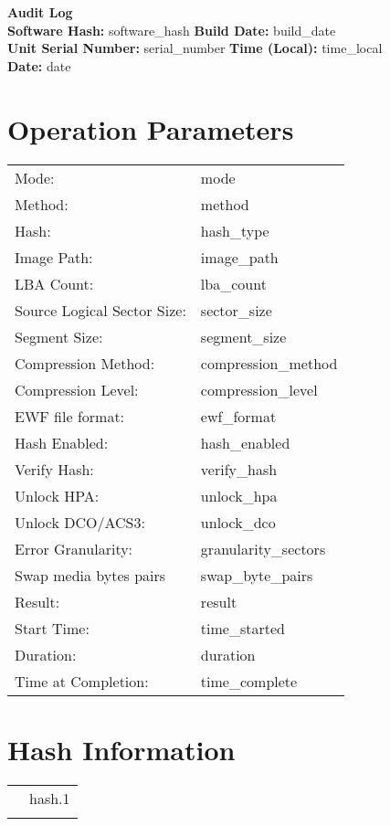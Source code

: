 \documentclass[a4paper,10pt]{article}
\begin{document}
\small

{\LARGE\textbf{Audit Log}}\\[1em]

\textbf{Software Hash:} {{ software_hash }} \hfill \textbf{Build Date:} {{ build_date }}\\
\textbf{Unit Serial Number:} {{ serial_number }} \hfill \textbf{Time (Local):} {{ time_local }}\\
\textbf{Date:} {{ date }}

\vspace{0.2em}
\section*{Operation Parameters}
\begin{tabular}{@{}ll}
Mode: & {{ mode }} \\
Method: & {{ method }} \\
Hash: & {{ hash_type }} \\
Image Path: & {{ image_path }} \\
LBA Count: & {{ lba_count }} \\
Source Logical Sector Size: & {{ sector_size }} \\
Segment Size: & {{ segment_size }} \\
Compression Method: & {{ compression_method }} \\
Compression Level: & {{ compression_level }} \\
EWF file format: & {{ ewf_format }} \\
Hash Enabled: & {{ hash_enabled }} \\
Verify Hash: & {{ verify_hash }} \\
Unlock HPA: & {{ unlock_hpa }} \\
Unlock DCO/ACS3: & {{ unlock_dco }} \\
Error Granularity: & {{ granularity_sectors }} \\
Swap media bytes pairs & {{ swap_byte_pairs }} \\
Result: & {{ result }} \\
Start Time: & {{ time_started }} \\
Duration: & {{ duration }} \\
Time at Completion: & {{ time_complete }} \\
\end{tabular}

\vspace{0.2em}
\section*{Hash Information}
\begin{tabular}{@{}ll}
{%
{{ hash.0 }}: & {{ hash.1 }} \\
{%
\end{tabular}
\end{document}
